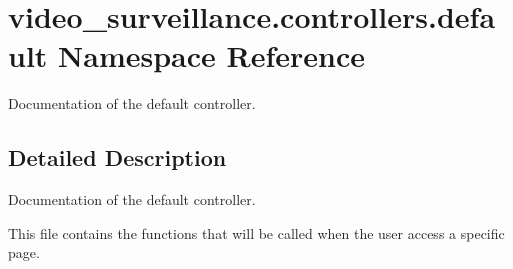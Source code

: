 \hypertarget{namespacevideo__surveillance_1_1controllers_1_1default}{}\section{video\+\_\+surveillance.\+controllers.\+default Namespace Reference}
\label{namespacevideo__surveillance_1_1controllers_1_1default}


Documentation of the default controller.  




\subsection{Detailed Description}
Documentation of the default controller. 

This file contains the functions that will be called when the user access a specific page. 